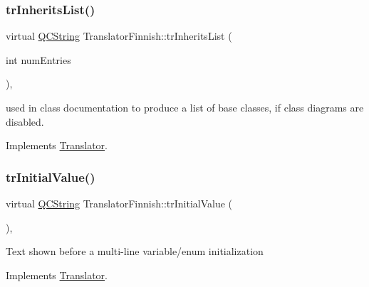 \mbox{\label{class_translator_finnish_a817cef81a7c9914356cac05ff29d5f10}} 
\subsubsection{\texorpdfstring{trInheritsList()}{trInheritsList()}}
{\footnotesize\ttfamily virtual \mbox{\hyperlink{class_q_c_string}{Q\+C\+String}} Translator\+Finnish\+::tr\+Inherits\+List (\begin{DoxyParamCaption}\item[{int}]{num\+Entries }\end{DoxyParamCaption})\hspace{0.3cm}{\ttfamily [inline]}, {\ttfamily [virtual]}}

used in class documentation to produce a list of base classes, if class diagrams are disabled. 

Implements \mbox{\hyperlink{class_translator}{Translator}}.

\mbox{\label{class_translator_finnish_a8109cd7dfccde6df274096901c022db3}} 
\subsubsection{\texorpdfstring{trInitialValue()}{trInitialValue()}}
{\footnotesize\ttfamily virtual \mbox{\hyperlink{class_q_c_string}{Q\+C\+String}} Translator\+Finnish\+::tr\+Initial\+Value (\begin{DoxyParamCaption}{ }\end{DoxyParamCaption})\hspace{0.3cm}{\ttfamily [inline]}, {\ttfamily [virtual]}}

Text shown before a multi-\/line variable/enum initialization 

Implements \mbox{\hyperlink{class_translator}{Translator}}.

\mbox{\label{class_translator_finnish_a02322dd115990b9149e18ece9e427585}} 
